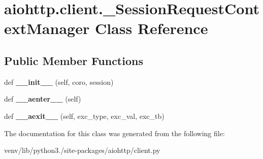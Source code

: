 \hypertarget{classaiohttp_1_1client_1_1___session_request_context_manager}{}\section{aiohttp.\+client.\+\_\+\+Session\+Request\+Context\+Manager Class Reference}
\label{classaiohttp_1_1client_1_1___session_request_context_manager}
\subsection*{Public Member Functions}
\begin{DoxyCompactItemize}
\item 
\mbox{\label{classaiohttp_1_1client_1_1___session_request_context_manager_a23f90fc8965ad8e1d591e7dd7cff0e4f}} 
def {\bfseries \+\_\+\+\_\+init\+\_\+\+\_\+} (self, coro, session)
\item 
\mbox{\label{classaiohttp_1_1client_1_1___session_request_context_manager_ad5e1d1929188de113c730d0e1cbcbade}} 
def {\bfseries \+\_\+\+\_\+aenter\+\_\+\+\_\+} (self)
\item 
\mbox{\label{classaiohttp_1_1client_1_1___session_request_context_manager_af128006178069cc598e4e1ddf7fc86f3}} 
def {\bfseries \+\_\+\+\_\+aexit\+\_\+\+\_\+} (self, exc\+\_\+type, exc\+\_\+val, exc\+\_\+tb)
\end{DoxyCompactItemize}


The documentation for this class was generated from the following file\+:\begin{DoxyCompactItemize}
\item 
venv/lib/python3./site-\/packages/aiohttp/client.\+py\end{DoxyCompactItemize}
